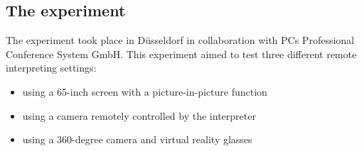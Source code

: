 \documentclass[output=paper]{langsci/langscibook}
\begin{document}
\subsection{The experiment}
\largerpage
\label{sub:ziegler:6.1}
The experiment took place in Düsseldorf in collaboration with PCs Professional Conference System GmbH. This experiment aimed to test three different remote interpreting settings: 

\begin{itemize}
\item using a 65-inch screen with a picture-in-picture function 
\item using a camera remotely controlled by the interpreter
\item using a 360-degree camera and virtual reality glasses 
\end{itemize}
\end{document}
